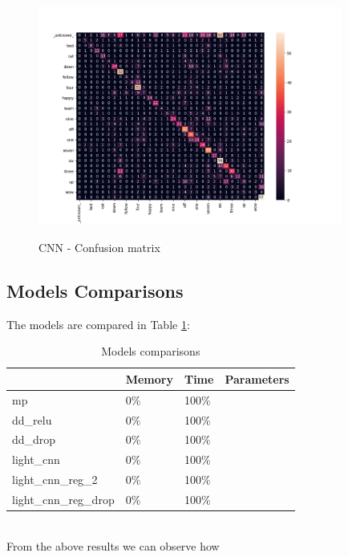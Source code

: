 \begin{figure}[h]
			\centering
	    	\includegraphics[width=10cm, height=8cm]{conf_matrix_cnn_dii_cm}
	    	\caption{CNN - Confusion matrix}
	    	\label{fig:conf_matrix_cnn}
\end{figure} 



\subsection*{\textbf{Models Comparisons}}
The models are compared in Table \ref{table:comparisons}:\\
\begin{table}[h!]
\centering
\begin{tabular}{ p{3cm}|p{1.5cm}|p{1.5cm}|p{1.5cm} }
 \hline
  & Memory & Time & Parameters \\
\hline\hline
mp & 0\% & 100\% & \\
dd\_relu & 0\% & 100\% & \\
dd\_drop & 0\% & 100\% & \\
light\_cnn & 0\% & 100\% & \\
light\_cnn\_reg\_2 & 0\% & 100\% & \\
light\_cnn\_reg\_drop & 0\% & 100\% & \\
\hline
\end{tabular}
\caption{Models comparisons}
\label{table:comparisons}
\end{table}\\
\noindent From the above results we can observe how {}